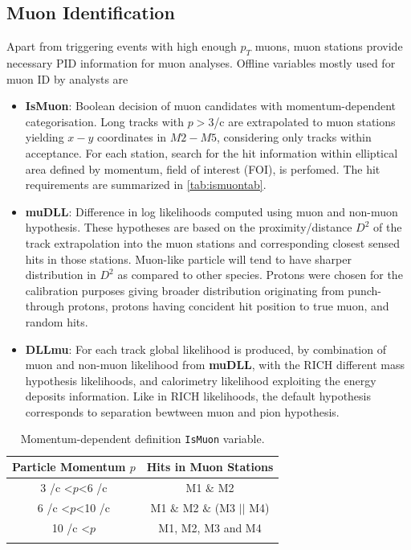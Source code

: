 \subsection{Muon Identification}
Apart from triggering events with high enough $p_{T}$ muons, muon stations provide necessary PID information for muon analyses. Offline variables mostly used for muon ID by analysts are
\begin{itemize}
	\item{\textbf{IsMuon}: Boolean decision of muon candidates with momentum-dependent categorisation. Long tracks with $p>3$\gev/c are extrapolated to muon stations yielding $x-y$ coordinates in $M2-M5$, considering only tracks within acceptance. For each station, search for the hit information within elliptical area defined by momentum, field of interest (\Gls{FOI}), is perfomed. The hit requirements are summarized in \autoref{tab:ismuontab}.}
	\item{\textbf{muDLL}: Difference in log likelihoods computed using muon and non-muon hypothesis. These hypotheses are based on the proximity/distance $D^{2}$ of the track extrapolation into the muon stations and corresponding closest sensed hits in those stations. Muon-like particle will tend to have sharper distribution in $D^{2}$ as compared to other species. Protons were chosen for the calibration purposes giving broader distribution originating from punch-through protons, protons having concident hit position to true muon, and random hits.}
	\item{\textbf{DLLmu}}:  For each track global likelihood is produced, by combination of muon and non-muon likelihood from \textbf{muDLL}, with the \Gls{RICH} different mass hypothesis likelihoods, and calorimetry likelihood exploiting the energy deposits information. Like in \Gls{RICH} likelihoods, the default hypothesis corresponds to separation bewtween muon and pion hypothesis.    

\end{itemize}


\begin{table}[!h]
	\centering
	\hspace*{-0.8cm}
	\begin{tabular}{c c}
		\hline
		Particle Momentum $p$  & Hits in Muon Stations \\ \hline
		3 \gev/c <$p$<6 \gev/c & M1 $\&$ M2\\
		6 \gev/c <$p$<10 \gev/c & M1 $\&$ M2 $\&$ (M3 $||$ M4) \\
		10 \gev/c <$p$ & M1, M2, M3 and M4 \\ \\\hline      
	\end{tabular}
	\caption{Momentum-dependent definition \texttt{IsMuon} variable.}
	\label{tab:ismuontab}
\end{table}   

